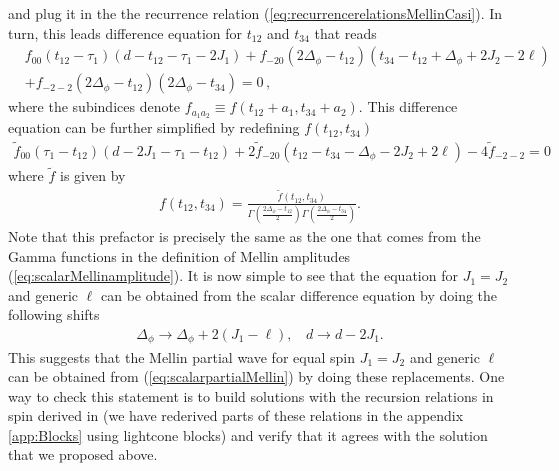 and plug it in the the recurrence relation (\ref{eq:recurrencerelationsMellinCasi}).  In turn, this leads difference equation for $t_{12}$ and $t_{34}$ that reads
\begin{align}
   & f_{00} \left(t_{12}-\tau _1\right) \left(d-t_{12}-\tau _1-2J_1\right)+f_{-20} \left(2 \Delta_\phi -t_{12}\right) \left(t_{34}-t_{12}+\Delta_\phi +2 J_2-2 \ell \right)\nonumber \\
   & +f_{-2-2} \left(2 \Delta_\phi -t_{12}\right) \left(2 \Delta_\phi -t_{34}\right)=0\,,
\end{align}
where the subindices denote $f_{a_1a_2} \equiv f(t_{12}+a_1,t_{34}+a_{2})$. This difference equation can be further simplified by redefining $f(t_{12},t_{34})$
\begin{align}
  \tilde{f}_{00} \left(\tau_1-t_{12}\right) \left(d-2 J_1-\tau_1-t_{12}\right)+2 \tilde{f}_{-20} \left(t_{12}-t_{34}-\Delta_{\phi}-2 J_2+2 \ell \right)-4 \tilde{f}_{-2-2}=0
\end{align}
where $\tilde{f}$ is given by
\begin{align}
  \label{eq:HfunctionMellin}
  f(t_{12},t_{34}) =\frac{\tilde{f}(t_{12},t_{34})}{\Gamma(\frac{2\Delta_{\phi}-t_{12}}{2})\Gamma(\frac{2\Delta_{\phi}-t_{34}}{2})} .
\end{align}
Note that this prefactor is precisely the same as the one that comes from the Gamma functions in the definition of Mellin amplitudes (\ref{eq:scalarMellinamplitude}).
It is now simple to see that the equation for $J_1=J_2$ and generic $\ell$ can be obtained from the scalar difference equation by doing the following shifts
\begin{align}
  \Delta_{\phi}\rightarrow \Delta_{\phi}+2(J_1-\ell)	,\ \ \ \ d\rightarrow d-2J_1 .
\end{align}
This suggests that the Mellin partial wave for equal spin $J_1=J_2$ and generic $\ell$ can be obtained from (\ref{eq:scalarpartialMellin}) by doing these replacements. One way to check this statement is to build solutions with  the recursion relations in spin derived in \cite{Poland:2021xjs} (we have rederived parts of these relations in the appendix \ref{app:Blocks} using lightcone blocks) and verify that it agrees with the solution that we proposed above.%


